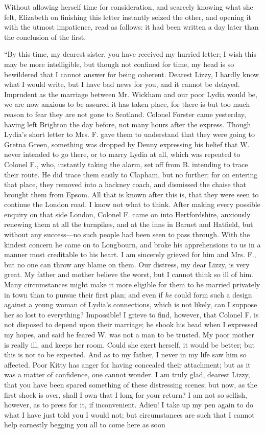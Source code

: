 Without allowing herself time for consideration, and scarcely knowing what she felt, Elizabeth on finishing this letter instantly seized the other, and opening it with the utmost impatience, read as follows: it had been written a day later than the conclusion of the first.

“By this time, my dearest sister, you have received my hurried letter; I wish this may be more intelligible, but though not confined for time, my head is so bewildered that I cannot answer for being coherent. Dearest Lizzy, I hardly know what I would write, but I have bad news for you, and it cannot be delayed. Imprudent as the marriage between Mr. Wickham and our poor Lydia would be, we are now anxious to be assured it has taken place, for there is but too much reason to fear they are not gone to Scotland. Colonel Forster came yesterday, having left Brighton the day before, not many hours after the express. Though Lydia's short letter to Mrs. F. gave them to understand that they were going to Gretna Green, something was dropped by Denny expressing his belief that W. never intended to go there, or to marry Lydia at all, which was repeated to Colonel F., who, instantly taking the alarm, set off from B. intending to trace their route. He did trace them easily to Clapham, but no further; for on entering that place, they removed into a hackney coach, and dismissed the chaise that brought them from Epsom. All that is known after this is, that they were seen to continue the London road. I know not what to think. After making every possible enquiry on that side London, Colonel F. came on into Hertfordshire, anxiously renewing them at all the turnpikes, and at the inns in Barnet and Hatfield, but without any success---no such people had been seen to pass through. With the kindest concern he came on to Longbourn, and broke his apprehensions to us in a manner most creditable to his heart. I am sincerely grieved for him and Mrs. F., but no one can throw any blame on them. Our distress, my dear Lizzy, is very great. My father and mother believe the worst, but I cannot think so ill of him. Many circumstances might make it more eligible for them to be married privately in town than to pursue their first plan; and even if {\em he} could form such a design against a young woman of Lydia's connections, which is not likely, can I suppose her so lost to everything? Impossible! I grieve to find, however, that Colonel F. is not disposed to depend upon their marriage; he shook his head when I expressed my hopes, and said he feared W. was not a man to be trusted. My poor mother is really ill, and keeps her room. Could she exert herself, it would be better; but this is not to be expected. And as to my father, I never in my life saw him so affected. Poor Kitty has anger for having concealed their attachment; but as it was a matter of confidence, one cannot wonder. I am truly glad, dearest Lizzy, that you have been spared something of these distressing scenes; but now, as the first shock is over, shall I own that I long for your return? I am not so selfish, however, as to press for it, if inconvenient. Adieu! I take up my pen again to do what I have just told you I would not; but circumstances are such that I cannot help earnestly begging you all to come here as soon 